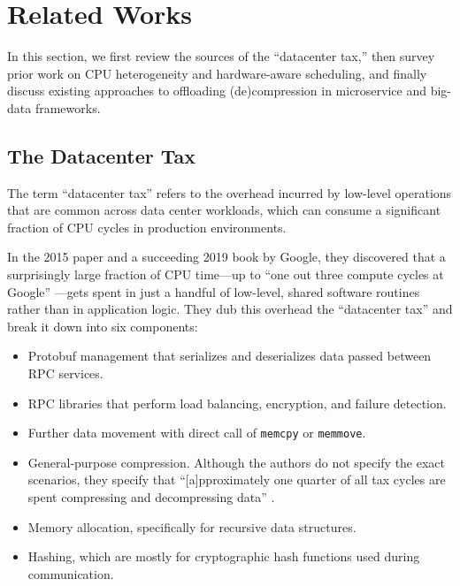 \section{Related Works}

In this section, we first review the sources of the “datacenter tax,” then survey prior work on CPU heterogeneity and hardware-aware scheduling, and finally discuss existing approaches to offloading (de)compression in microservice and big-data frameworks.

\subsection{The Datacenter Tax}

The term ``datacenter tax'' refers to the overhead incurred by low-level operations that are common across data center workloads, which can consume a significant fraction of CPU cycles in production environments.

In the 2015 paper \cite{kanev2015profiling} and a succeeding 2019 book \cite{barrosoDatacenterComputer2019} by Google, they discovered that a surprisingly large fraction of CPU time---up to ``one out three compute cycles at Google'' \cite[p. 165]{barrosoDatacenterComputer2019}---gets spent in just a handful of low-level, shared software routines rather than in application logic. They dub this overhead the ``datacenter tax'' and break it down into six components:

\begin{itemize}
    \item Protobuf management that serializes and deserializes data passed between RPC services.
    \item RPC libraries that perform load balancing, encryption, and failure detection.
    \item Further data movement with direct call of \texttt{memcpy} or \texttt{memmove}.
    \item General-purpose compression. Although the authors do not specify the exact scenarios, they specify that ``[a]pproximately one quarter of all tax cycles are spent compressing and decompressing data'' \cite[p. 162]{kanev2015profiling}.
    \item Memory allocation, specifically for recursive data structures.
    \item Hashing, which are mostly for cryptographic hash functions used during communication.
\end{itemize}

